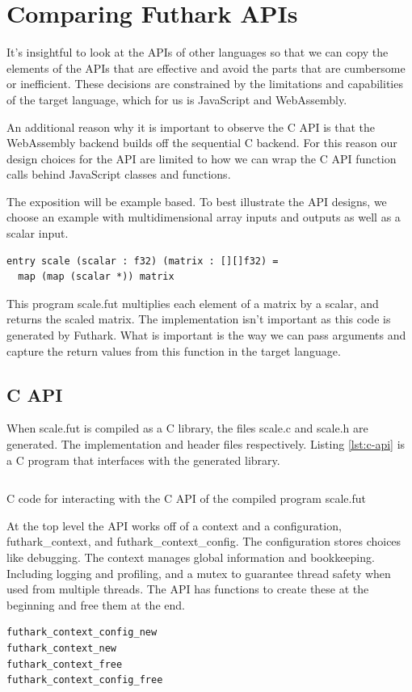 \documentclass[11pt]{book}
\begin{document}
\section{Comparing Futhark APIs}

It's insightful to look at the APIs of other languages so that we can copy the elements of the APIs that are effective and avoid the parts that are cumbersome or inefficient. These decisions are constrained by the limitations and capabilities of the target language, which for us is JavaScript and WebAssembly.

An additional reason why it is important to observe the C API is that the WebAssembly backend builds off the sequential C backend. For this reason our design choices for the API are limited to how we can wrap the C API function calls behind JavaScript classes and functions.

The exposition will be example based. To best illustrate the API designs, we choose an example with multidimensional array inputs and outputs as well as a scalar input. 
\begin{verbatim}
entry scale (scalar : f32) (matrix : [][]f32) = 
  map (map (scalar *)) matrix
\end{verbatim}
This program scale.fut multiplies each element of a matrix by a scalar, and returns the scaled matrix. The implementation isn't important as this code is generated by Futhark. What is important is the way we can pass arguments and capture the return values from this function in the target language. 

\subsection{C API}
When scale.fut is compiled as a C library, the files scale.c and scale.h are generated. The implementation and header files respectively. Listing \ref{lst:c-api} is a C program that interfaces with the generated library. 


\begin{listing}[H] 
        \inputminted[fontsize=\small,baselinestretch=0.5,linenos]{C}{code/compiler/api_examples/example.c}
                \label{lst:c-api}    
        \caption{C code for interacting with the C API of the compiled program scale.fut }
\end{listing} 

At the top level the API works off of a context and a configuration, futhark\_context, and futhark\_context\_config. The configuration stores choices like debugging. The context manages global information and bookkeeping. Including logging and profiling, and a mutex to guarantee thread safety when used from multiple threads. The API has functions to create these at the beginning and free them at the end. 
\begin{verbatim}
futhark_context_config_new
futhark_context_new
futhark_context_free
futhark_context_config_free
\end{verbatim}
\end{document}
